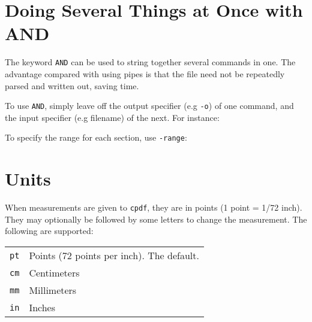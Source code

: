 \documentclass{book}
\newcommand{\cpdf}{\texttt{cpdf}}
\begin{document}
\noindent{}


\section{Doing Several Things at Once with AND}

The keyword \texttt{AND} can be used to string together several commands in
one. The advantage compared with using pipes is that the file need not be
repeatedly parsed and written out, saving time.

To use \texttt{AND}, simply leave off the output specifier (e.g \texttt{-o}) of
one command, and the input specifier (e.g filename) of the next. For instance:

\noindent{}

\noindent To specify the range for each section, use \texttt{-range}:

\noindent{}


\section{Units}
When measurements are given to \cpdf, they are in points (1 point = 1/72 inch). They may optionally
be followed by some letters to change the measurement. The following are
supported:

\begin{table}[h]
\centering
\begin{tabular}{rl}
  \texttt{pt} & Points (72 points per inch). The default. \\
  \texttt{cm} & Centimeters \\
  \texttt{mm} & Millimeters \\
  \texttt{in} & Inches \\
\end{tabular}
\end{table}
\end{document}
